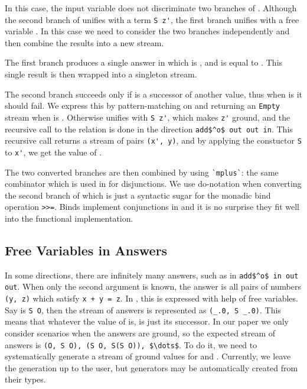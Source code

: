 In this case, the input variable \z does not discriminate two branches of \conde.
Although the second branch of \conde unifies \z with a term \lstinline{S z'}, the first branch unifies \z with a free variable \y.
In this case we need to consider the two branches independently and then combine the results into a new stream.

The first \conde branch produces a single answer in which \x is \zero, and \y is equal to \z.
This single result is then wrapped into a singleton stream.

The second \conde branch succeeds only if \z is a successor of another value, thus when \z is \zero it should fail.
We express this by pattern-matching on \z and returning an \lstinline{Empty} stream when \z is \zero.
Otherwise \z unifies with \lstinline{S z'}, which makes \lstinline{z'} ground, and the recursive call to the relation is done in the direction \lstinline{add$^o$ out out in}.
This recursive call returns a stream of pairs \lstinline{(x', y)}, and by applying the constuctor \lstinline{S} to \lstinline{x'}, we get the value of \x.

The two converted \conde branches are then combined by using \lstinline{`mplus`}: the same combinator which is used in \mk for disjunctions.
We use do-notation when converting the second branch of \conde which is just a syntactic sugar for the monadic bind operation \lstinline{>>=}.
Binds implement conjunctions in \mk and it is no surprise they fit well into the functional implementation.




\subsection{Free Variables in Answers}

In some directions, there are infinitely many answers, such as in \lstinline{add$^o$ in out out}.
When only the second argument is known, the answer is all pairs of numbers \lstinline{(y, z)} which satisfy \lstinline{x + y = z}.
In \mk, this is expressed with help of free variables.
Say \x is \lstinline{S O}, then the stream of answers is represented as \lstinline{(_.0, S _.0)}.
This means that whatever the value of \y is, \z is just its successor.
In our paper we only consider scenarios when the answers are ground, so the expected stream of answers is \lstinline{(O, S O), (S O, S(S O)), $\dots$}.
To do it, we need to systematically generate a stream of ground values for \y and \z.
Currently, we leave the generation up to the user, but generators may be automatically created from their types.

